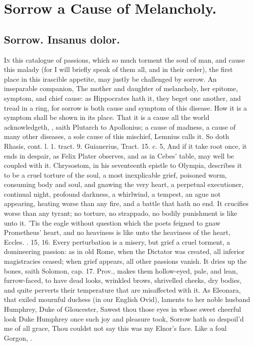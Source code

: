 {%
\section{Sorrow a Cause of Melancholy.}

\subsection{Sorrow. Insanus dolor.}
\lettrine{I}{n} this catalogue of passions, which so much torment the soul of man, and cause
this malady (for I will briefly speak of them all, and in their order), the
first place in this irascible appetite, may justly be challenged by sorrow. An
inseparable companion, The mother and daughter of melancholy,
her epitome, symptom, and chief cause: as Hippocrates hath it, they beget one
another, and tread in a ring, for sorrow is both cause and symptom of this
disease. How it is a symptom shall be shown in its place.
That it is a cause all the world acknowledgeth, , saith Plutarch to Apollonius; a
cause of madness, a cause of many other diseases, a sole cause of this
mischief, Lemnius calls it. So doth Rhasis, cont. l. 1. tract. 9.
Guianerius, Tract. 15. c. 5, And if it take root once, it ends in
despair, as Felix Plater observes, and as in Cebes' table,
may well be coupled with it. Chrysostom, in his seventeenth
epistle to Olympia, describes it to be a cruel torture of the soul, a
most inexplicable grief, poisoned worm, consuming body and soul, and
gnawing the very heart, a perpetual executioner, continual night,
profound darkness, a whirlwind, a tempest, an ague not appearing,
heating worse than any fire, and a battle that hath no end. It
crucifies worse than any tyrant; no torture, no strappado, no bodily
punishment is like unto it. 'Tis the eagle without question which the
poets feigned to gnaw Prometheus' heart, and no heaviness is like
unto the heaviness of the heart, Eccles. . 15, 16. Every
perturbation is a misery, but grief a cruel torment, a domineering
passion: as in old Rome, when the Dictator was created, all inferior
magistracies ceased; when grief appears, all other passions vanish. It
dries up the bones, saith Solomon, cap. 17. Prov., makes them
hollow-eyed, pale, and lean, furrow-faced, to have dead looks, wrinkled
brows, shrivelled cheeks, dry bodies, and quite perverts their
temperature that are misaffected with it. As Eleonara, that exiled
mournful duchess (in our English Ovid), laments to her noble
husband Humphrey, Duke of Gloucester,
Sawest thou those eyes in whose sweet cheerful look
Duke Humphrey once such joy and pleasure took,
Sorrow hath so despoil'd me of all grace,
Thou couldst not say this was my Elnor's face.
Like a foul Gorgon, \etc{}.

}
